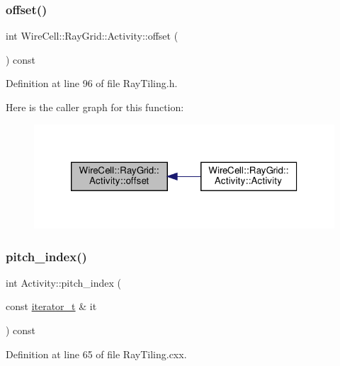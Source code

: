 \subsubsection{\texorpdfstring{offset()}{offset()}}
{\footnotesize\ttfamily int Wire\+Cell\+::\+Ray\+Grid\+::\+Activity\+::offset (\begin{DoxyParamCaption}{ }\end{DoxyParamCaption}) const\hspace{0.3cm}{\ttfamily [inline]}}



Definition at line 96 of file Ray\+Tiling.\+h.

Here is the caller graph for this function\+:
\nopagebreak
\begin{figure}[H]
\begin{center}
\leavevmode
\includegraphics[width=320pt]{class_wire_cell_1_1_ray_grid_1_1_activity_a8c051a729c264f4ca6e91e21e6edf729_icgraph}
\end{center}
\end{figure}
\mbox{\label{class_wire_cell_1_1_ray_grid_1_1_activity_add0847697b47de9b2e1c6c6d46cc31e7}} 
\subsubsection{\texorpdfstring{pitch\+\_\+index()}{pitch\_index()}}
{\footnotesize\ttfamily int Activity\+::pitch\+\_\+index (\begin{DoxyParamCaption}\item[{const \hyperlink{class_wire_cell_1_1_ray_grid_1_1_activity_a4e6dc9c676d517a5819962b10a2638fe}{iterator\+\_\+t} \&}]{it }\end{DoxyParamCaption}) const}



Definition at line 65 of file Ray\+Tiling.\+cxx.

